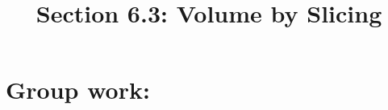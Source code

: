 \documentclass[noinstructornotes]{ximera}
\title{Section 6.3: Volume by Slicing}
\begin{document}
\begin{abstract}		\end{abstract}
\maketitle

\section{Group work:}
\end{document}
